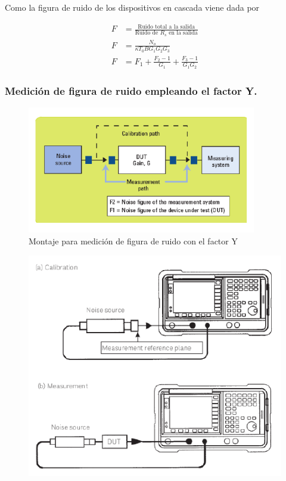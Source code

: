 \documentclass{article}
\begin{document}
	Como la figura de ruido de los dispositivos en cascada viene dada por
	
	\begin{align} 
		F &= \frac{\text{Ruido total a la salida}}{\text{Ruido de $R_s$ en la salida}} \\
		F &= \frac{N_o}{{\kappa}T_0BG_1G_2G_3} \\
		F &= F_1 + \frac{F_2 - 1}{G_1} + \frac{F_3 - 1}{G_1G_2}		
	\end{align} 		
	
	\subsubsection{Medición de figura de ruido empleando el factor Y.}	
	
	\begin{figure}[h!]
		\centering
		\includegraphics[width=10cm]{Imagenes/InstrumentacionFactorY.pdf}
		\caption{Montaje para medición de figura de ruido con el factor Y}
	\end{figure}

	\begin{figure}[h!]
		\centering
		\includegraphics[width=16cm]{Imagenes/InstrumentacionCalibracionMedicion.pdf}
	\end{figure}
\end{document}

